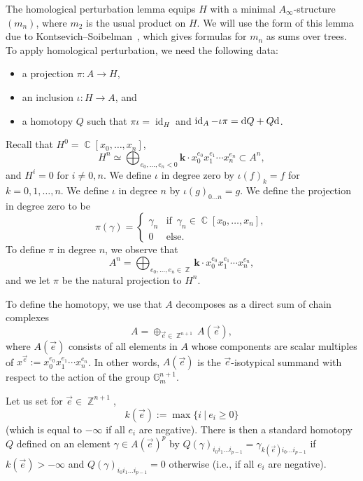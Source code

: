 \documentclass[pdftex]{sigma}
\numberwithin{equation}{section}
\DeclareMathOperator\C{\mathbb C}
\DeclareMathOperator\Z{\mathbb Z}
\newcommand{\sub}{\subset}
\newcommand{\id}{\operatorname{id}}
\newcommand{\G}{{\mathbb G}}
\renewcommand{\k}{{\mathbf{k}}}
\begin{document}
The homological perturbation lemma equips $H$ with a minimal $A_\infty$-structure $(m_n)$, where $m_2$ is the
usual product on $H$. We will use the form of this lemma due to Kontsevich--Soibelman~\cite{KS}, which gives formulas
for $m_n$ as sums over trees. To apply homological perturbation, we need the following data:
\begin{itemize}\itemsep=0pt
\item a projection $\pi\colon  A\to H$,
\item an inclusion $\iota\colon  H\to A$, and
\item a homotopy $Q$ such that $\pi\iota=\id_H$ and $\id_A-\iota\pi={\rm d}Q+Q{\rm d}$.
\end{itemize}
Recall that
 $H^0=\C[x_0,\dots ,x_n]$,
 \[
 H^n\simeq \bigoplus_{e_0,\dots ,e_n<0} \k\cdot x_0^{e_0}x_1^{e_1}\cdots x_n^{e_n}\sub A^n,
 \]
 and $H^i=0$ for $i\neq 0,n$. We define $\iota$ in degree zero by $\iota(f)_k=f$
 for $k=0,1,\dots ,n$. We define $\iota$ in degree $n$ by $\iota(g)_{0\ldots n}=g$. We define the projection
 in degree zero to be
\[
\pi(\gamma)=\begin{cases}
\gamma_n & \text{if } \, \gamma_n\in \C[x_0,\dots ,x_n],\\
0 & \text{else}.	
\end{cases}
\]
To define $\pi$ in degree $n$, we observe that
\[A^n=\bigoplus_{e_0,\dots ,e_n\in \Z}\k\cdot x_0^{e_0}x_1^{e_1}\cdots x_n^{e_n},\]
 and we let $\pi$ be the natural projection to $H^n$.

To define the homotopy, we use that $A$ decomposes as a direct sum of chain complexes
\[
A=\oplus_{\vec{e}\in \Z^{n+1}}A(\vec{e}),
\]
where $A(\vec{e})$ consists of all elements
 in $A$ whose components are scalar multiples of $x^{\vec{e}}:=x_0^{e_0}x_1^{e_1}\cdots x_n^{e_n}$. In other words,
 $A(\vec{e})$ is the $\vec{e}$-isotypical summand with respect to the action of the group $\G_m^{n+1}$.

 Let us set for $\vec{e}\in\Z^{n+1}$,
 \[k(\vec{e}):=\max\{i \ |\ e_i\geq 0\}\]
(which is equal to $-\infty$ if all $e_i$ are negative).
 There is then a standard homotopy $Q$ defined on an element $\gamma\in A(\vec{e})^{p}$ by
$Q(\gamma)_{i_0i_1\dots  i_{p-1}}=\gamma_{k(\vec{e})i_0\dots i_{p-1}}$ if $k(\vec{e})>-\infty$
 and $Q(\gamma)_{i_0i_1\dots  i_{p-1}}=0$ otherwise (i.e., if all $e_i$ are negative).
\end{document}
